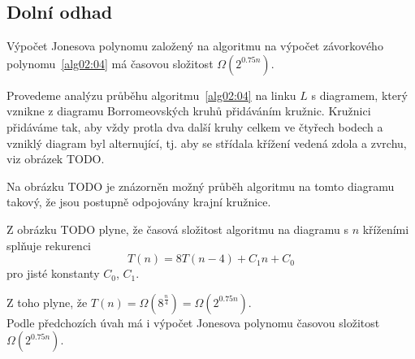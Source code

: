 \subsection{Dolní odhad}

\begin{tvrz}
Výpočet Jonesova polynomu založený na algoritmu na výpočet závorkového polynomu~\ref{alg02:04} má časovou složitost  $\Omega(2^{0.75 n})$.
\end{tvrz}

\begin{dukaz}
Provedeme analýzu průběhu algoritmu~\ref{alg02:04} na linku $L$ s diagramem, který vznikne z diagramu Borromeovských kruhů přidáváním kružnic. Kružnici přidáváme tak, aby vždy protla dva další kruhy celkem ve čtyřech bodech a vzniklý diagram byl alternující, tj. aby se střídala křížení vedená zdola a zvrchu, viz obrázek TODO.


Na obrázku TODO je znázorněn možný průběh algoritmu na tomto diagramu takový, že jsou postupně odpojovány krajní kružnice. 

Z obrázku TODO plyne, že časová složitost algoritmu na diagramu s $n$ kříženími splňuje rekurenci
$$ T(n) = 8T(n-4) + C_1 n + C_0  $$
pro jisté konstanty $C_0$, $C_1$.

Z toho plyne, že $T(n) = \Omega(8^{\frac{n}{4}})  =  \Omega(2^{0.75 n})$. \\

Podle předchozích úvah má i výpočet Jonesova polynomu časovou složitost $\Omega(2^{0.75n})$.
\end{dukaz}
